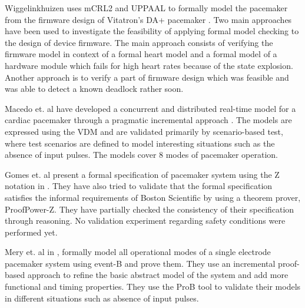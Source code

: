Wiggelinkhuizen uses mCRL2 and UPPAAL to formally model the pacemaker from the firmware design of Vitatron's DA+ pacemaker \cite{Wigg}. Two main approaches have been used to investigate the feasibility of applying formal model checking to the design of device firmware. The main approach consists of verifying the firmware model in context of a formal heart model and a formal model of a hardware module which fails for high heart rates because of the state explosion. Another approach is to verify a part of firmware design which was feasible and was able to detect a known deadlock rather soon.

Macedo et. al have developed a concurrent and distributed real-time model for a cardiac pacemaker through a pragmatic incremental approach \cite{Macedo}. The models are expressed using the VDM and are validated primarily by scenario-based test, where test scenarios are defined to model interesting situations such as the absence of input pulses. The models cover 8 modes of pacemaker operation.

Gomes et. al present a formal specification of pacemaker system using the Z notation in \cite{Gomes}. They have also tried to validate that the formal specification satisfies the informal requirements of Boston Scientific by using a theorem prover, ProofPower-Z. They have partially checked the consistency of their specification through reasoning. No validation experiment regarding safety conditions were performed yet.

Mery et. al in \cite{Mery}, formally model all operational modes of a single electrode pacemaker system using event-B and prove them. They use an incremental proof-based approach to refine the basic abstract model of the system and add more functional and timing properties. They use the ProB tool to validate their models in different situations such as absence of input pulses. \\






